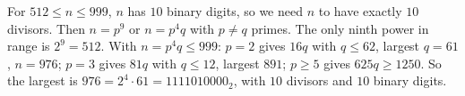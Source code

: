 For $512\le n\le999$, $n$ has $10$ binary digits, so we need $n$ to have exactly $10$ divisors. Then $n=p^9$ or $n=p^4q$ with $p\ne q$ primes. The only ninth power in range is $2^9=512$. With $n=p^4q\le999$: $p=2$ gives $16q$ with $q\le62$, largest $q=61$, $n=976$; $p=3$ gives $81q$ with $q\le12$, largest $891$; $p\ge5$ gives $625q\ge1250$. So the largest is $\boxed{976}=2^4\cdot61=1111010000_2$, with $10$ divisors and $10$ binary digits.
